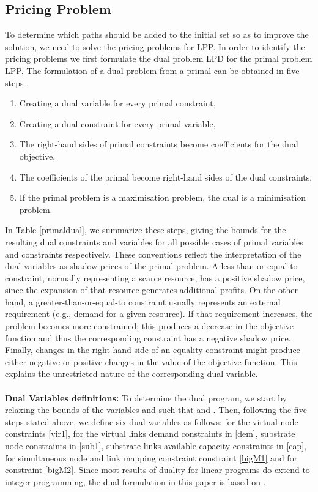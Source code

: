 \documentclass[journal]{IEEEtran}
\begin{document}
\subsection{Pricing Problem}
To determine which paths should be added to the initial set so as to improve the solution, we need to solve the pricing problems for LPP. In order to identify the pricing problems we first formulate the dual problem LPD for the primal problem LPP. The formulation of a dual problem from a primal can be obtained in five steps \cite{Lahaie08}.
\begin{enumerate}
\item Creating a dual variable for every primal constraint,
\item Creating a dual constraint for every primal variable,
\item The right-hand sides of primal constraints become coefficients for the dual objective,
\item The coefficients of the primal become right-hand sides of the dual constraints,
\item If the primal problem is a maximisation problem, the dual is a minimisation problem.
\end{enumerate}
In Table \ref{primaldual}, we summarize these steps, giving the bounds for the resulting dual constraints and variables for all possible cases of primal variables and constraints respectively. These conventions reflect the interpretation of the dual variables as shadow prices of the primal problem. A less-than-or-equal-to constraint, normally representing a scarce resource, has a positive shadow price, since the expansion of that resource generates additional profits. On the other hand, a greater-than-or-equal-to constraint usually represents an external requirement (e.g., demand for a given resource). If that requirement increases, the problem becomes more constrained; this produces a decrease in the objective function and thus the corresponding constraint has a negative shadow price. Finally, changes in the right hand side of an equality constraint might produce either negative or positive changes in the value of the objective function. This explains the unrestricted nature of the corresponding dual variable.\\\\
\textbf{Dual Variables definitions:}
To determine the dual program, we start by relaxing the bounds of the variables  and  such that  and . Then, following the five steps stated above, we define six dual variables as follows:   for the virtual node constraints \eqref{vir1},  for the virtual links demand constraints in \eqref{dem},  substrate node constraints in \eqref{sub1},  substrate links available capacity constraints in \eqref{cap},  for simultaneous node and link mapping constraint constraint \eqref{bigM1} and  for constraint \eqref{bigM2}. Since most results of duality for linear programs do extend to integer programming\cite{Guzelsoy10}, the dual formulation in this paper is based on \cite{Lahaie08}.
\end{document}
